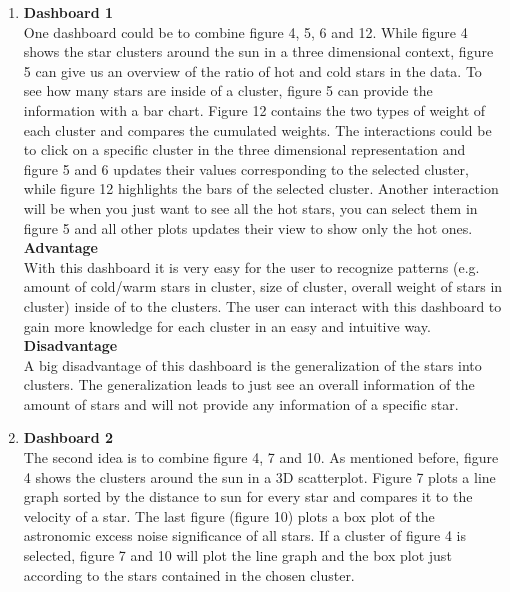 \documentclass{article}
\begin{document}
\begin{enumerate}
\item \textbf{Dashboard 1} \\
One dashboard could be to combine figure 4, 5, 6 and 12. While figure 4 shows the star clusters around the sun in a three dimensional context, figure 5 can give us an overview of the ratio of hot and cold stars in the data. To see how many stars are inside of a cluster, figure 5 can provide the information with a bar chart. Figure 12 contains the two types of weight of each cluster and compares the cumulated weights. The interactions could be to click on a specific cluster in the three dimensional representation and figure 5 and 6 updates their values corresponding to the selected cluster, while figure 12 highlights the bars of the selected cluster. Another interaction will be when you just want to see all the hot stars, you can select them in figure 5 and all other plots updates their view to show only the hot ones. \\

\textbf{Advantage} \\
With this dashboard it is very easy for the user to recognize patterns (e.g. amount of cold/warm stars in cluster, size of cluster, overall weight of stars in cluster) inside of to the clusters. The user can interact with this dashboard to gain more knowledge for each cluster in an easy and intuitive way. \\

\textbf{Disadvantage} \\
A big disadvantage of this dashboard is the generalization of the stars into clusters. The generalization leads to just see an overall information of the amount of stars and will not provide any information of a specific star. \\

\item \textbf{Dashboard 2} \\
The second idea is to combine figure 4, 7 and 10. As mentioned before, figure 4 shows the clusters around the sun in a 3D scatterplot. Figure 7 plots a line graph sorted by the distance to sun for every star and compares it to the velocity of a star. The last figure (figure 10) plots a box plot of the astronomic excess noise significance of all stars. If a cluster of figure 4 is selected, figure 7 and 10 will plot the line graph and the box plot just according to the stars contained in the chosen cluster. \\


\end{enumerate}
\end{document}
